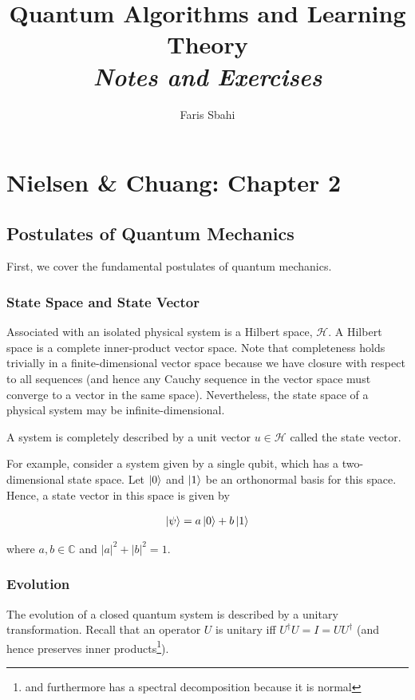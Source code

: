 \documentclass[11pt]{article}
\title{Quantum Algorithms and Learning Theory\\\textit{Notes and Exercises}}
\author{Faris Sbahi}
\newcommand\0{\mathbf{0}}
\newcommand\CC{\mathbb{C}}
\newcommand\<{\langle}
\renewcommand\>{\rangle}
\begin{document}
\maketitle

\section{Nielsen \& Chuang: Chapter 2}

\subsection{Postulates of Quantum Mechanics}

First, we cover the fundamental postulates of quantum mechanics. 

\subsubsection{State Space and State Vector}

Associated with an isolated physical system is a Hilbert space, $\mathcal{H}$. A Hilbert space is a complete inner-product vector space. Note that completeness holds trivially in a finite-dimensional vector space because we have closure with respect to all sequences (and hence any Cauchy sequence in the vector space must converge to a vector in the same space). Nevertheless, the state space of a physical system may be infinite-dimensional. 

A system is completely described by a unit vector $u \in \mathcal{H}$ called the state vector.

For example, consider a system given by a single qubit, which has a two-dimensional state space. Let $\ket{0}$ and $\ket{1}$ be an orthonormal basis for this space. Hence, a state vector in this space is given by 

\begin{align*}
\ket{\psi} = a\ket{0} + b\ket{1}	
\end{align*}


where $a, b \in \CC$ and $|a|^2 + |b|^2 = 1$. 

\subsubsection{Evolution}\label{post-discrete-evol}

The evolution of a closed quantum system is described by a unitary transformation. Recall that an operator $U$ is unitary iff $U^\dagger U = I = UU^\dagger$ (and hence preserves inner products\footnote{and furthermore has a spectral decomposition because it is normal}).
\end{document}
